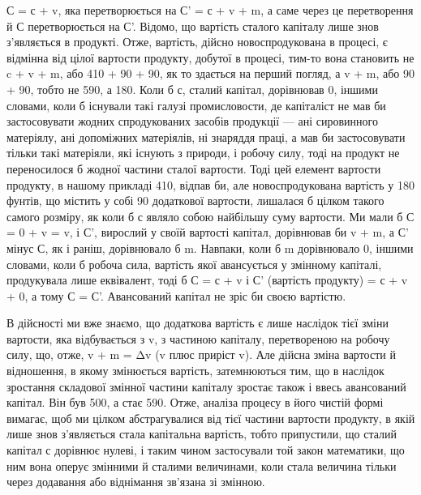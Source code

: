 С = с + v, яка перетворюється на С' = с + v + m, а саме через це
перетворення й С перетворюється на С'. Відомо, що вартість сталого
капіталу лише знов з’являється в продукті. Отже, вартість,
дійсно новоспродукована в процесі, є відмінна від цілої вартости
продукту, добутої в процесі, тим-то вона становить не
c + v + m, або 410 + 90 + 90, як то здається на перший погляд, а v + m, або
90 + 90, тобто не 590, а 180. Коли б с, сталий капітал,
дорівнював 0, іншими словами, коли б існували такі галузі промисловости,
де капіталіст не мав би застосовувати жодних спродукованих
засобів продукції — ані сировинного матеріялу, ані
допоміжних матеріялів, ні знаряддя праці, а мав би застосовувати
тільки такі матеріяли, які існують з природи, і робочу
силу, тоді на продукт не переносилося б жодної частини сталої
вартости. Тоді цей елемент вартости продукту, в нашому прикладі
410, відпав би, але новоспродукована вартість
у 180 фунтів, що містить у собі 90 додаткової
вартости, лишалася б цілком такого самого розміру, як коли б
с являло собою найбільшу суму вартости. Ми мали б С = 0 + v = v,
і С', вирослий у своїй вартості капітал, дорівнював би v + m, а
С' мінус С, як і раніш, дорівнювало б m. Навпаки, коли б m дорівнювало
0, іншими словами, коли б робоча сила, вартість якої
авансується у змінному капіталі, продукувала лише еквівалент,
тоді б С = с + v і С' (вартість продукту) = с + v + 0, а тому С = С'.
Авансований капітал не зріс би своєю вартістю.

В дійсності ми вже знаємо, що додаткова вартість є лише наслідок
тієї зміни вартости, яка відбувається з v, з частиною капіталу,
перетвореною на робочу силу, що, отже, v + m = Δv (v плюс
приріст v). Але дійсна зміна вартости й відношення, в якому
змінюється вартість, затемнюються тим, що в наслідок зростання
складової змінної частини капіталу зростає також і ввесь авансований
капітал. Він був 500, а стає 590. Отже, аналіза процесу в його
чистій формі вимагає, щоб ми цілком абстрагувалися від тієї
частини вартости продукту, в якій лише знов з’являється стала
капітальна вартість, тобто припустили, що сталий капітал с
дорівнює нулеві, і таким чином застосували той закон математики,
що ним вона оперує змінними й сталими величинами, коли
стала величина тільки через додавання або віднімання зв’язана
зі змінною.
